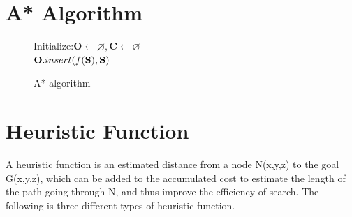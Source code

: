 \documentclass[conference]{IEEEtran}
\makeatletter
\newcommand{\removelatexerror}{\let\@latex@error\@gobble}
\makeatother
\begin{document}
\section{A* Algorithm}
\begin{figure}[htbp]
	\removelatexerror
	\begin{algorithm}[H]
		\caption{A* algorithm}
		\LinesNumbered
		Initialize:$ \textbf{O}\leftarrow \varnothing, \textbf{C}\leftarrow \varnothing $\\
		$ \textbf{O}.insert(f(\bf S),\bf S) $\\
		
		
	\end{algorithm}
\end{figure}

\section{Heuristic Function}
A heuristic function is an estimated distance from a node N(x,y,z) to the goal G(x,y,z), which can be added to the accumulated cost to estimate the length of the path going through N, and thus improve the efficiency of search. The following is three different types of heuristic function.
\end{document}
